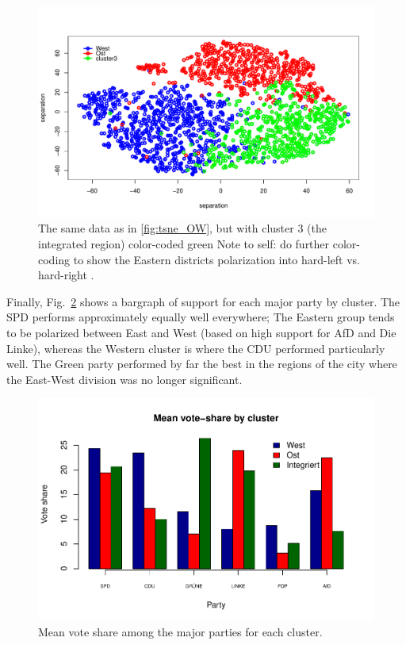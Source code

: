 \documentclass[amsmath,amssymb,nofootinbib,12pt,preprint]{revtex4}
\begin{document}
\begin{itemize}
\begin{figure}[h]%
\includegraphics[scale=.5]{../figures/tsne_OW+C3}%
\caption{ The same data  as in \ref{fig:tsne_OW}, but with cluster 3 (the integrated region) color-coded green {\color{red} Note to self: do further color-coding to show the Eastern districts polarization into hard-left vs. hard-right }.}
\label{fig:tsne_C123}%
\end{figure}

\end{itemize}

Finally, Fig.~\ref{fig:barcluster} shows a bargraph of support for each major party by cluster. The SPD performs approximately equally well everywhere; The Eastern group tends to be polarized between East and West (based on high support for AfD and Die Linke), whereas the Western cluster is where the CDU performed particularly well. The Green party performed by far the best in the regions of the city where the East-West division was no longer significant.

\begin{figure}[h]%
\includegraphics[scale=.75]{../figures/bargraph_vote2_6parties}%
\caption{Mean vote share among the major parties for each cluster.  } 
\label{fig:barcluster}%
\end{figure}
\end{document}
